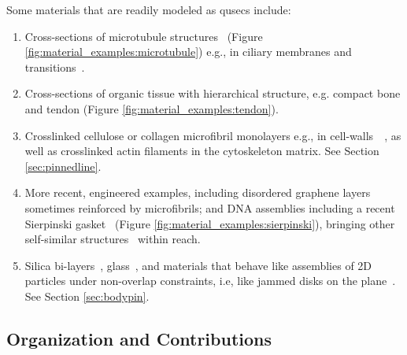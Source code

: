 Some materials that are readily modeled as qusecs include:
%
\begin{enumerate}
    \item \label{materialexample1} Cross-sections of microtubule structures~\cite{microtubule_necklace} (Figure \ref{fig:material_examples:microtubule}) e.g., in ciliary membranes and transitions~\cite{microtubule_cilia}.

    \item \label{materialexample2} Cross-sections of organic tissue with hierarchical structure, e.g. compact bone and tendon (Figure \ref{fig:material_examples:tendon}).

    \item \label{materialexample3} Crosslinked cellulose or collagen microfibril monolayers e.g., in cell-walls~\cite{wikimediacommons2010afm}~\cite{wikimediacommons2007plant}, as well as crosslinked actin filaments in the cytoskeleton matrix. See Section \ref{sec:pinnedline}.

    \item \label{materialexample4} More recent, engineered examples, including disordered graphene layers~\cite{Graphene1}~\cite{Graphene2} sometimes reinforced by microfibrils; and DNA assemblies including a recent Sierpinski gasket~\cite{self_assembly_sierpinski} (Figure \ref{fig:material_examples:sierpinski}), bringing other self-similar structures~\cite{wikimediacommons2012subdivision} within reach.

    \item \label{materialexample5} Silica bi-layers~\cite{silica_bilayers}, glass~\cite{sructure_of_2d_glass}, and materials that behave like assemblies of 2D particles under non-overlap constraints, i.e, like jammed disks on the plane~\cite{jammed_disks}. See Section \ref{sec:bodypin}.
\end{enumerate}




\subsection{Organization and Contributions}
\label{sec:cont}

